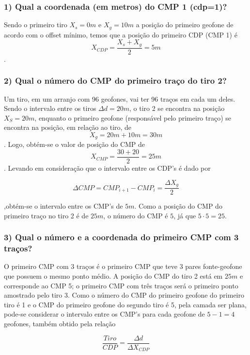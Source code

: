 \documentclass[12pt,a4paper]{article}
\begin{document}
\subsubsection{1) Qual a coordenada (em metros) do CMP 1 (cdp=1)?}

Sendo o primeiro tiro $X_s = 0m$ e $X_g = 10m$ a posição do primeiro geofone de acordo com o offset mínimo, temos que a posição do primeiro CDP (CMP 1) é $$X_{CDP} = \frac{X_s + X_g}{2} = 5m$$.




\subsubsection{2) Qual o número do CMP do primeiro traço do tiro 2?}

Um tiro, em um arranjo com 96 geofones, vai ter 96 traços em cada um deles. Sendo o intervalo entre os tiros $\Delta d = 20m$, o tiro 2 se encontra na posição $X_S = 20m$, enquanto o primeiro geofone (responsável pelo primeiro traço) se encontra na posição, em relação ao tiro, de $$X_g = 20m + 10m = 30m$$. Logo, obtém-se o valor de posição do CMP de $$X_{CMP} = \frac{30+20}{2} = 25m$$. Levando em consideração que o intervalo entre os CDP's é dado por 

\begin{equation}
    \Delta CMP =  CMP_{i+1} -  CMP_{i} = \frac{\Delta X_g}{2}
\end{equation}

\noindent

,obtém-se o intervalo entre os CMP's de $5m$. Como a posição do CMP do primeiro traço no tiro 2 é de $25m$, o número do CMP é $5$, já que $5 \cdot 5 = 25$.


\subsubsection{3) Qual o número e a coordenada do primeiro CMP com 3 traços?}


O primeiro CMP com 3 traços é o primeiro CMP que teve 3 pares fonte-geofone que possuem o mesmo ponto médio. A posição do CMP do tiro 2 está em $25m$ e corresponde ao CMP 5; o primeiro CMP com três traços será o primeiro ponto amostrado pelo tiro 3. Como o número do CMP do primeiro geofone do primeiro tiro é 1 e o CMP do primeiro geofone do segundo tiro é 5, pela camada ser plana, pode-se considerar o intervalo entre os CMP's para cada geofone de $5-1 = 4$ geofones, também obtido pela relação 

\begin{equation}
    \frac{Tiro}{CDP} = \frac{\Delta d}{\Delta X_{CDP}}
\end{equation}
\end{document}
